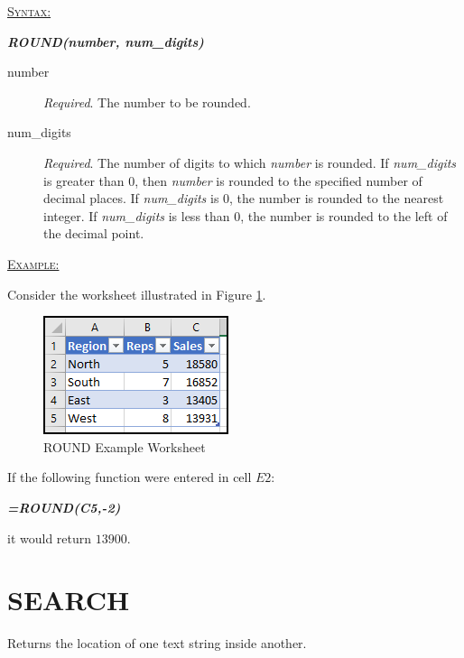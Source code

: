 \begin{addmargin}[1cm]{0cm}
	
	\medskip
	\underline{\textsc{Syntax:}}
	\medskip
	
	{\color{Syntax}
		\noindent\textbf{\textit{ROUND(number, num\_digits)}}
	}
	
	\begin{description}
		\item[number] \textit{Required}. The number to be rounded.
		\item[num\_digits] \textit{Required}. The number of digits to which \textit{number} is rounded. If \textit{num\_digits} is greater than $ 0 $, then \textit{number} is rounded to the specified number of decimal places. If \textit{num\_digits} is $ 0 $, the number is rounded to the nearest integer. If \textit{num\_digits} is less than $ 0 $, the number is rounded to the left of the decimal point.
	\end{description}

	\medskip
	\noindent\underline{\textsc{Example:}}
	\medskip
	
	\noindent Consider the worksheet illustrated in Figure \ref{apa:ron}.
	
	\begin{figure}[H]
		\centering
		\includegraphics[width=\maxwidth{.45\linewidth}]{gfx/apa_fig01}
		\caption{ROUND Example Worksheet}
		\label{apa:ron}
	\end{figure}
	
	\noindent If the following function were entered in cell $ E2 $:
	
	{\color{Syntax}
		\textit{\textbf{=ROUND(C5,-2)}}
	}
	
	\noindent it would return $ 13900 $.

\end{addmargin}

\section{SEARCH}

Returns the location of one text string inside another.

